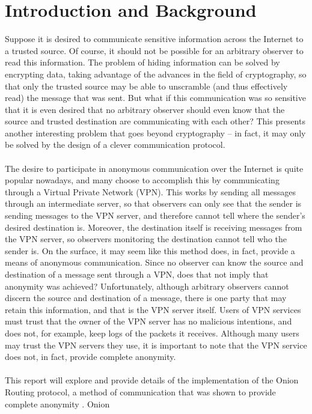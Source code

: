 \documentclass[10pt]{report}
\begin{document}
\chapter{Introduction and Background}
Suppose it is desired to communicate sensitive information across the Internet to a trusted source.
Of course, it should not be possible for an arbitrary observer to read this information. The problem
of hiding information can be solved by encrypting data, taking advantage of the advances in the
field of cryptography, so that only the trusted source may be able to unscramble (and thus
effectively read) the message that was sent. But what if this communication was so sensitive that it
is even desired that no arbitrary observer should even know that the source and trusted destination
are communicating with each other? This presents another interesting problem that goes beyond
cryptography -- in fact, it may only be solved by the design of a clever communication protocol.\\\\
The desire to participate in anonymous communication over the Internet is quite popular nowadays,
and many choose to accomplish this by communicating through a Virtual Private Network (VPN). This
works by sending all messages through an intermediate server, so that observers can only see that
the sender is sending messages to the VPN server, and therefore cannot tell where the sender's
desired destination is. Moreover, the destination itself is receiving messages from the VPN server,
so observers monitoring the destination cannot tell who the sender is. On the surface, it may seem
like this method does, in fact, provide a means of anonymous communication. Since no observer can
know the source and destination of a message sent through a VPN, does that not imply that anonymity
was achieved? Unfortunately, although arbitrary observers cannot discern the source and destination
of a message, there is one party that may retain this information, and that is the VPN
server itself. Users of VPN services must trust that the owner of the VPN server has no malicious
intentions, and does not, for example, keep logs of the packets it receives. Although many users may
trust the VPN servers they use, it is important to note that the VPN service does not, in fact,
provide complete anonymity.\\\\
This report will explore and provide details of the implementation of the Onion Routing protocol, a
method of communication that was shown to provide complete anonymity \cite{FormalTreatment}. Onion
\end{document}
